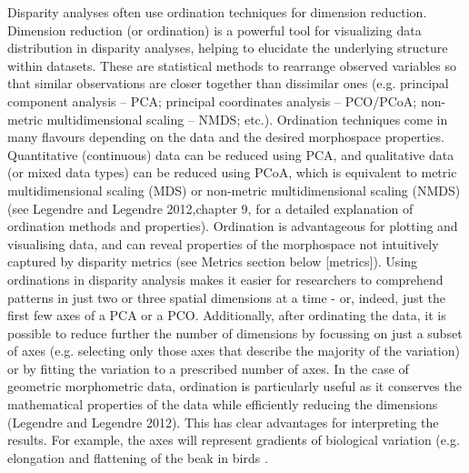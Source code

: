\documentclass[12pt,letterpaper]{article}
\begin{document}
Disparity analyses often use ordination techniques for dimension reduction.
Dimension reduction (or ordination) is a powerful tool for visualizing data distribution in disparity analyses, helping to elucidate the underlying structure within datasets.
These are statistical methods to rearrange observed variables so that similar observations are closer together than dissimilar ones (e.g. principal component analysis -- PCA; principal coordinates analysis -- PCO/PCoA; non-metric multidimensional scaling -- NMDS; etc.).
Ordination techniques come in many flavours depending on the data and the desired morphospace properties.
Quantitative (continuous) data can be reduced using PCA, and qualitative data (or mixed data types) can be reduced using PCoA, which is equivalent to metric multidimensional scaling (MDS) or non-metric multidimensional scaling (NMDS) (see Legendre and Legendre 2012,chapter 9, for a detailed explanation of ordination methods and properties).
Ordination is advantageous for plotting and visualising data, and can reveal properties of the morphospace not intuitively captured by disparity metrics (see Metrics section below {[}metrics{]}).
Using ordinations in disparity analysis makes it easier for researchers to comprehend patterns in just two or three spatial dimensions at a time - or, indeed, just the first few axes of a PCA or a PCO.
Additionally, after ordinating the data, it is possible to reduce further the number of dimensions by focussing on just a subset of axes (e.g. selecting only those axes that describe the majority of the variation) or by fitting the variation to a prescribed number of axes.
In the case of geometric morphometric data, ordination is particularly useful as it conserves the mathematical properties of the data while efficiently reducing the dimensions (Legendre and Legendre 2012). %
This has clear advantages for interpreting the results.
For example, the axes will represent gradients of biological variation (e.g. elongation and flattening of the beak in birds \citep{Cooney2017-ly}.
\end{document}
